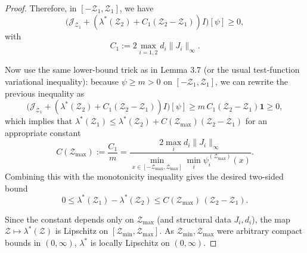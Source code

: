 \documentclass[a4paper,11pt]{amsart}
\theoremstyle{definition}
\numberwithin{equation}{section}
\theoremstyle{definition}
\begin{document}
\begin{proof}
Therefore, in $[-\mathcal Z_1,\mathcal Z_1]$, we have
\[
\big(\mathscr J_{\mathcal Z_1} + (\lambda^\ast(\mathcal Z_2) + C_1(\mathcal Z_2-\mathcal Z_1)) I\big)[\psi]
\geq 0,
\]
with
\[
C_1:=2\max_{i=1,2} d_i\|J_i\|_\infty.
\]

Now use the same lower-bound trick as in Lemma 3.7 (or the usual test-function variational inequality): because \(\psi \geq m>0\) on \([-{\mathcal Z_1},{\mathcal Z_1}]\), we can rewrite the previous inequality as
\[
\big(\mathscr J_{\mathcal Z_1} + (\lambda^\ast(\mathcal Z_2) + C_1(\mathcal Z_2-\mathcal Z_1)) I\big)[\psi]
\geq m\,C_1(\mathcal Z_2-\mathcal Z_1)\mathbf{1}\geq 0,
\]
which implies that \(\lambda^\ast(\mathcal Z_1)\leq \lambda^\ast(\mathcal Z_2) + C(\mathcal Z_{\max}) (\mathcal Z_2-\mathcal Z_1)\) for an appropriate constant
\[
C(\mathcal Z_{\max}) := \frac{C_1}{m} = \frac{2\max_i d_i\|J_i\|_\infty}{\min_{x\in[-\mathcal Z_{\max},\mathcal Z_{\max}]}\min_i\psi_i^{(\mathcal Z_{\max})}(x)} .
\]
Combining this with the monotonicity inequality gives the desired two-sided bound
\[
0 \leq \lambda^\ast(\mathcal Z_1) - \lambda^\ast(\mathcal Z_2) \leq C(\mathcal Z_{\max})\,(\mathcal Z_2-\mathcal Z_1).
\]

Since the constant depends only on \(\mathcal Z_{\max}\) (and structural data \(J_i,d_i\)), the map \(\mathcal Z\mapsto\lambda^\ast(\mathcal Z)\) is Lipschitz on \([\mathcal Z_{\min},\mathcal Z_{\max}]\). As \(\mathcal Z_{\min},\mathcal Z_{\max}\) were arbitrary compact bounds in \((0,\infty)\), \(\lambda^\ast\) is locally Lipschitz on \((0,\infty)\).
\end{proof}
\end{document}

